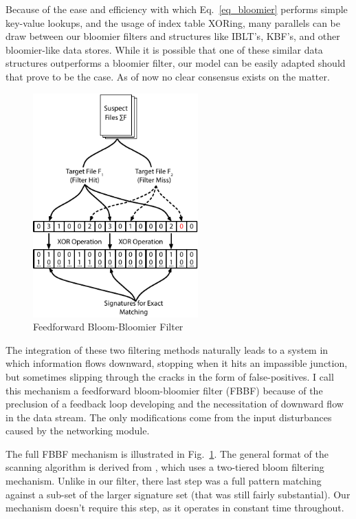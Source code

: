 \documentclass[12pt,journal]{IEEEtran}
\begin{document}
Because of the ease and efficiency with which Eq.~\ref{eq_bloomier} performs simple key-value lookups, and the usage of index table XORing, many parallels can be draw between our bloomier filters and structures like IBLT's\cite{Goodrich2011}, KBF's\cite{Xiong2014}, and other bloomier-like data stores. While it is possible that one of these similar data structures outperforms a bloomier filter, our model can be easily adapted should that prove to be the case. As of now no clear consensus exists on the matter.\par

\begin{figure}[!t]
\centering
\includegraphics[width=2.5in]{figures/vector/FFBF}
\caption{Feedforward Bloom-Bloomier Filter}
\label{fig_FFBF}
\end{figure}

The integration of these two filtering methods naturally leads to a system in which information flows downward, stopping when it hits an impassible junction, but sometimes slipping through the cracks in the form of false-positives. I call this mechanism a feedforward bloom-bloomier filter (FBBF) because of the preclusion of a feedback loop developing and the necessitation of downward flow in the data stream. The only modifications come from the input disturbances caused by the networking module.\par

The full FBBF mechanism is illustrated in Fig.~\ref{fig_FFBF}. The general format of the scanning algorithm is derived from \cite{Cha2011}, which uses a two-tiered bloom filtering mechanism. Unlike in our filter, there last step was a full pattern matching against a sub-set of the larger signature set (that was still fairly substantial). Our mechanism doesn't require this step, as it operates in constant time throughout.
\end{document}
